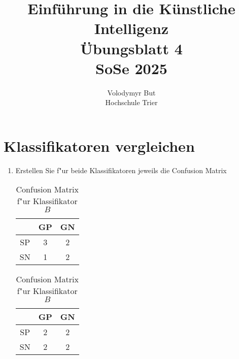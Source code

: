 \documentclass[10pt, oneside]{article}
\title{Einführung in die Künstliche Intelligenz\\[15pt]\Large{Übungsblatt 4}\\[10pt]\Large{SoSe 2025}}
\author{Volodymyr But\\[10pt]Hochschule Trier}
\date{}
\begin{document}
\maketitle
\vspace{25px}

\section{Klassifikatoren vergleichen}

\begin{enumerate}[1.]
    \item Erstellen Sie f"ur beide Klassifikatoren jeweils die Confusion Matrix
        \begin{table}[h]
            \centering
            \begin{minipage}[t]{0.4\linewidth}
                \centering
                \begin{tabular}{|c|c|c|}
                    \hline
                    \  & GP & GN \\
                    \hline
                    SP & 3  & 2  \\
                    \hline
                    SN & 1  & 2  \\
                    \hline
                \end{tabular}
                \caption{Confusion Matrix f"ur Klassifikator $A$}
            \end{minipage}
            \hspace{20px}
            \begin{minipage}[t]{0.4\linewidth}
                \centering
                \begin{tabular}{|c|c|c|}
                    \hline
                    \  & GP & GN \\
                    \hline
                    SP & 2  & 2  \\
                    \hline
                    SN & 2  & 2  \\
                    \hline
                \end{tabular}
                \caption{Confusion Matrix f"ur Klassifikator $B$}
            \end{minipage}
        \end{table}


\end{enumerate}
\end{document}
